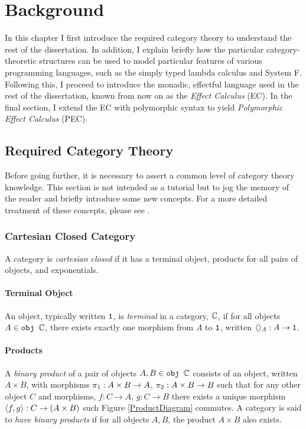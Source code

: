 
\chapter{Background}



In this chapter I first introduce the required category theory to understand the rest of the dissertation. In addition, I explain briefly how the particular category-theoretic structures can be used to model particular features of various programming languages, such as the simply typed lambda calculus and System F. Following this, I proceed to introduce the monadic, effectful language used in the rest of the dissertation, known from now on as the \textit{Effect Calculus} (EC). In the final section, I extend the EC with polymorphic syntax to yield \textit{Polymorphic Effect Calculus} (PEC).

\section{Required Category Theory}\label{CategoryTheoryRequirements}


Before going further, it is necessary to assert a common level of category theory knowledge. This section is not intended as a tutorial but to jog the memory of the reader and briefly introduce some new concepts. For a more detailed treatment of these concepts, please see \cite{maclane:71}.

\subsection{Cartesian Closed Category}\label{CCC}
A category is \textit{cartesian closed} if it has a terminal object, products for all pairs of objects, and exponentials.

\subsubsection{Terminal Object}
An object, typically written $\texttt{1}$, is \textit{terminal} in a category, $\mathbb{C}$, if for all objects $A\in\texttt{obj }\mathbb{C}$, there exists exactly one morphism from $A$ to $\texttt{1}$, written $\langle\rangle_{A}: A \rightarrow \texttt{1}$.

\subsubsection{Products}
A \textit{binary product} of a pair of objects $A, B\in\texttt{obj }\mathbb{C}$ consists of an object, written $A \times B$, with morphisms $\pi_1: A\times B\rightarrow A$, $\pi_2: A\times B \rightarrow B$ such that for any other object $C$ and morphisms, $f: C\rightarrow A$, $g: C\rightarrow B$ there exists a unique morphism $\langle f, g\rangle: C \rightarrow (A\times B)$ such Figure \ref{ProductDiagram} commutes.
A category is said to \textit{have binary products} if for all objects $A, B$, the product $A\times B$ also exists.

